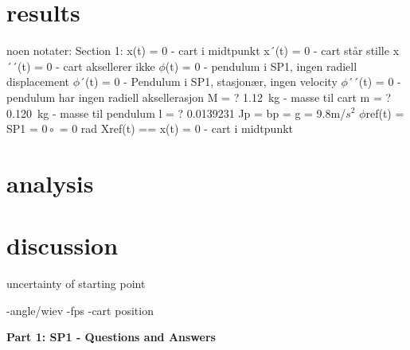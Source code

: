 \documentclass{article}
\begin{document}
\section{results}
noen notater:
Section 1:
x(t) = 0 - cart i midtpunkt \newline
x´(t) = 0 - cart står stille \newline
x´´(t) = 0 - cart aksellerer ikke \newline
\(\phi\)(t) = 0 - pendulum i SP1, ingen radiell displacement \newline
\(\phi\)´(t) = 0 - Pendulum i SP1, stasjonær, ingen velocity \newline
\(\phi\)´´(t) = 0 - pendulum har ingen radiell aksellerasjon \newline
M = ? \SI{1.12}{kg} - masse til cart \newline
m = ?\SI{0.120}{kg} - masse til pendulum \newline
l = ? \SI{ 0.0139231}{} \newline
Jp = \newline
bp = \newline
g = 9.8m/\(s^2\) \newline
\(\phi\)ref(t) = SP1 = \(0\circ \) = 0 rad \newline
Xref(t) == x(t) = 0 - cart i midtpunkt\newline





\section{analysis}

\section{discussion}
uncertainty of starting point

-angle/wiev
-fps
-cart position


\textbf{Part 1: SP1 - Questions and Answers}
\end{document}
